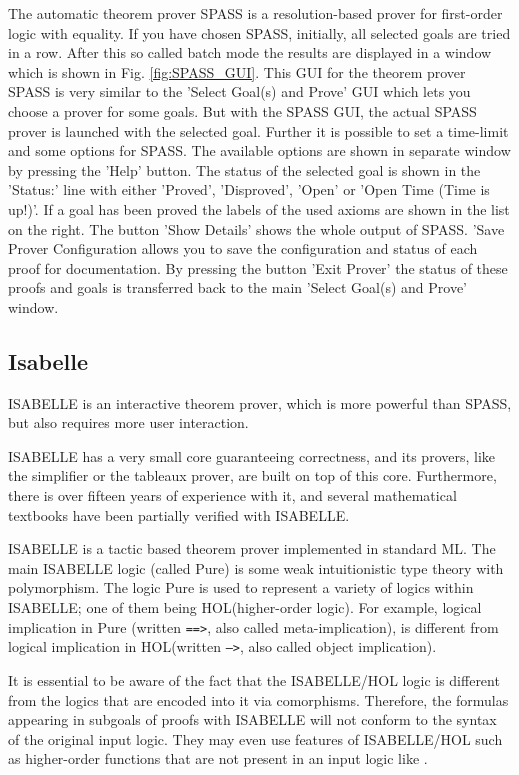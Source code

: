 \documentclass{article}
\newcommand{\normalTEXTSC}[2]{{#1\scriptsize#2}}
\newcommand     {\HOL}{\normalTEXTSC{H}{OL}\xspace}
\newcommand     {\Isabelle}{\normalTEXTSC{I}{SABELLE}\xspace}
\begin{document}
The automatic theorem prover SPASS
\cite{WeidenbachEtAl02} is a resolution-based prover for first-order logic
with equality. 
If you have chosen SPASS, initially, all selected goals are tried in a
row. After this so called batch mode the results are displayed in a
window which is shown in Fig. \ref{fig:SPASS_GUI}. This GUI for the
theorem prover SPASS is very similar to the 'Select Goal(s) and
Prove' GUI which lets you choose a prover for some goals. But with the
SPASS GUI, the actual SPASS prover is launched with the selected
goal. Further it is possible to set a time-limit and some options for
SPASS. The available options are shown in separate window by pressing
the 'Help' button. The status of the selected goal is shown in the
'Status:' line with either 'Proved', 'Disproved', 'Open' or 'Open Time
(Time is up!)'. If a goal has been proved the labels of the used
axioms are shown in the list on the right. The button 'Show Details'
shows the whole output of SPASS. 'Save Prover Configuration allows you
to save the configuration and status of each proof for
documentation. By pressing the button 'Exit Prover' the status of
these proofs and goals is transferred back to the main 'Select Goal(s)
and Prove' window.

\subsection*{Isabelle}

\Isabelle \cite{NipPauWen02} is an interactive theorem prover, which is
more powerful than SPASS, but also requires more user interaction.

\Isabelle 
has a very small core guaranteeing correctness, and its provers,
like the simplifier or the tableaux prover, are built on top of this
core. Furthermore, there is over fifteen years of experience with it,
and several mathematical textbooks have been partially 
verified with
\Isabelle. 

\Isabelle is a tactic based theorem prover implemented in standard ML.
The main \Isabelle logic (called Pure) is some weak intuitionistic type
theory with polymorphism. The logic Pure is used to represent a
variety of logics within \Isabelle; one of them being \HOL (higher-order
logic).  For example, logical implication in Pure (written
\texttt{==>}, also called meta-implication), is different from logical
implication in \HOL (written \texttt{-->}, also called object
implication).

It is essential to be aware of the fact that the \Isabelle/\HOL logic
is different from the logics that are encoded into it via comorphisms.
Therefore, the formulas appearing in subgoals of proofs with \Isabelle
will not conform to the syntax of the original input logic.  They may
even use features of \Isabelle/\HOL such as higher-order functions
that are not present in an input logic like \CASL.
\end{document}
